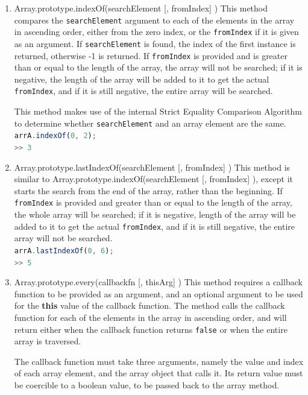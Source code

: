 \documentclass[a4paper,11pt,twoside]{report}
\def\jsinline{\lstinline[language=JavaScript, basicstyle=\small]}%\end{lstlisting}
\begin{document}
\begin{enumerate}
\item Array.prototype.indexOf(searchElement [, fromIndex] ) \newline
This method compares the \jsinline|searchElement| argument to each of the elements in the array in ascending order, either from the zero index, or the \jsinline|fromIndex| if it is given as an argument. If \jsinline|searchElement| is found, the index of the first instance is returned, otherwise -1 is returned. If \jsinline|fromIndex| is provided and is greater than or equal to the length of the array, the array will not be searched; if it is negative, the length of the array will be added to it to get the actual \jsinline|fromIndex|, and if it is still negative, the entire array will be searched.

This method makes use of the internal Strict Equality Comparison Algorithm to determine whether \jsinline|searchElement| and an array element are the same.\\
\jsinline|arrA.indexOf(0, 2);|\\
\jsinline|>> 3|

\item Array.prototype.lastIndexOf(searchElement [, fromIndex] ) \newline
This method is similar to Array.prototype.indexOf(searchElement [, fromIndex] ), except it starts the search from the end of the array, rather than the beginning. If \jsinline|fromIndex| is provided and greater than or equal to the length of the array, the whole array will be searched; if it is negative, length of the array will be added to it to get the actual \jsinline|fromIndex|, and if it is still negative, the entire array will not be searched.\\
\jsinline|arrA.lastIndexOf(0, 6);|\\
\jsinline|>> 5|

\item Array.prototype.every(callbackfn [, thisArg] ) \newline
This method requires a callback function to be provided as an argument, and an optional argument to be used for the \textbf{this} value of the callback function. The method calls the callback function for each of the elements in the array in ascending order, and will return either when the callback function returns \texttt{false} or when the entire array is traversed.

The callback function must take three arguments, namely the value and index of each array element, and the array object that calls it. Its return value must be coercible to a boolean value, to be passed back to the array method.


\end{enumerate}
\end{document}
